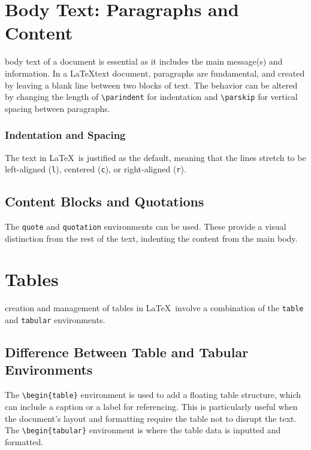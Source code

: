 \documentclass[12pt,journal,compsoc]{IEEEtran}
\begin{document}
\section{Body Text: Paragraphs and Content}
 body text of a document is essential as it includes the main message(s) and information. In a \LaTeX text document, paragraphs are fundamental, and created by leaving a blank line between two blocks of text. The behavior can be altered by changing the length of \texttt{\textbackslash parindent} for indentation and \texttt{\textbackslash parskip} for vertical spacing between paragraphs.  

\subsubsection{Indentation and Spacing}
The text in \LaTeX\ is justified as the default, meaning that the lines stretch to be left-aligned (\texttt{l}), centered (\texttt{c}), or right-aligned (\texttt{r}).

\subsection{Content Blocks and Quotations}
The \texttt{quote} and \texttt{quotation} environments can be used. These provide a visual distinction from the rest of the text, indenting the content from the main body.

\section{Tables}
 creation and management of tables in \LaTeX\ involve a combination of the \texttt{table} and \texttt{tabular} environments.

\subsection{Difference Between Table and Tabular Environments}
The \texttt{\textbackslash begin\{table\}} environment is used to add a floating table structure, which can include a caption or a label for referencing. This is particularly useful when the document's layout and formatting require the table not to disrupt the text. The \texttt{\textbackslash begin\{tabular\}} environment is where the table data is inputted and formatted. 
\end{document}
